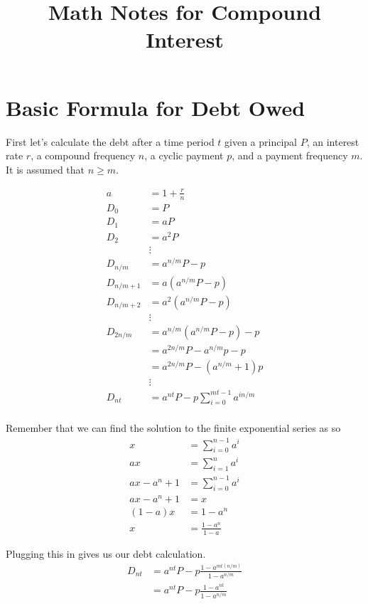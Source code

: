\documentclass[12pt]{article}
\title{Math Notes for Compound Interest}
\author{}
\date{}
\begin{document}
\maketitle

\section{Basic Formula for Debt Owed}

First let's calculate the debt after a time period $t$ given a principal $P$, an
interest rate $r$, a compound frequency $n$, a cyclic payment $p$, and a payment
frequency $m$.
It is assumed that $n \geq m$.

\begin{align*}
    a &= 1 + \frac{r}{n}\\
    D_0 &= P\\
    D_1 &= aP\\
    D_2 &= a^2 P\\
        &\vdots\\
    D_{n/m} &= a^{n/m} P - p\\
    D_{n/m+1} &= a (a^{n/m} P - p)\\
    D_{n/m+2} &= a^2 (a^{n/m} P - p)\\
            &\vdots\\
    D_{2n/m} &= a^{n/m} (a^{n/m} P - p) - p\\
             &= a^{2n/m} P - a^{n/m} p - p\\
             &= a^{2n/m} P - (a^{n/m} + 1) p\\
           &\vdots\\
    D_{nt} &= a^{nt} P - p \sum_{i = 0}^{mt - 1} a^{in/m}\\
\end{align*}

Remember that we can find the solution to the finite exponential series as so
\begin{align*}
    x &= \sum_{i = 0}^{n - 1} a^i\\
    a x &= \sum_{i = 1}^{n} a^i\\
    a x - a^n + 1 &= \sum_{i = 0}^{n - 1} a^i\\
    a x - a^n + 1 &= x\\
    (1 - a) x &= 1 - a^n\\
    x &= \frac{1 - a^n}{1 - a}
\end{align*}

Plugging this in gives us our debt calculation.
\begin{align*}
    D_{nt} &= a^{nt} P - p \frac{1 - a^{mt (n/m)}}{1 - a^{n/m}}\\
           &= a^{nt} P - p \frac{1 - a^{nt}}{1 - a^{n/m}}
\end{align*}
\end{document}
